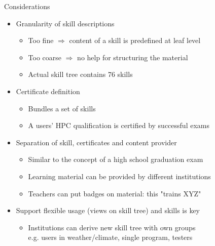 \documentclass[compress,aspectratio=169]{beamer}
\begin{document}
\begin{frame}{Considerations}
	\begin{itemize}
		\item Granularity of skill descriptions
		\begin{itemize}
			\item Too fine $\Rightarrow$ content of a skill is predefined at leaf level
			\item Too coarse $\Rightarrow$ no help for structuring the material
			\item Actual skill tree contains 76 skills
		\end{itemize}

		\item Certificate definition
		\begin{itemize}
			\item Bundles a set of skills %
			\item A users' HPC qualification is certified by successful exams
		\end{itemize}
		\item Separation of skill, certificates and content provider
		\begin{itemize}
			\item Similar to the concept of a high school graduation exam %
			\item Learning material can be provided by different institutions
			\item Teachers can put badges on material: this "trains XYZ"
		\end{itemize}
		\item Support flexible usage (views on skill tree) and skills is key
		\begin{itemize}
			\item Institutions can derive new skill tree with own groups \\
			e.g. users in weather/climate, single program, testers
			\end{itemize}
	\end{itemize}
\end{frame}
\end{document}
